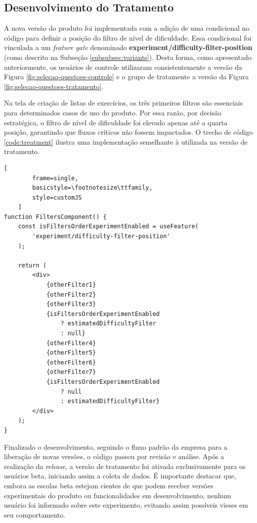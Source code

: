\subsection{Desenvolvimento do Tratamento}

A nova versão do produto foi implementada com a adição de uma condicional no código para definir a posição do filtro de nível de dificuldade. Essa condicional foi vinculada a um \textit{feature gate} denominado \textbf{experiment/difficulty-filter-position} (como descrito na Subseção \ref{subsubsec:variants}). Desta forma, como apresentado anteriormente, os usuários de controle utilizaram consistentemente a versão da Figura \ref{fig:selecao-questoes-controle} e o grupo de tratamente a versão da Figura \ref{fig:selecao-questoes-tratamento}.

Na tela de criação de listas de exercícios, os três primeiros filtros são essenciais para determinados casos de uso do produto. Por essa razão, por decisão estratégica, o filtro de nível de dificuldade foi elevado apenas até a quarta posição, garantindo que fluxos críticos não fossem impactados. O trecho de código \ref{code:treatment} ilustra uma implementação semelhante à utilizada na versão de tratamento.

\begin{code}[!ht]
    \caption{Versão de Tratamento}
    \begin{lstlisting}[
        frame=single,
        basicstyle=\footnotesize\ttfamily,
        style=customJS
    ]
function FiltersComponent() {
    const isFiltersOrderExperimentEnabled = useFeature(
        'experiment/difficulty-filter-position'
    );

    return (
        <div>
            {otherFilter1}
            {otherFilter2}
            {otherFilter3}
            {isFiltersOrderExperimentEnabled 
                ? estimatedDifficultyFilter 
                : null}
            {otherFilter4}
            {otherFilter5}
            {otherFilter6}
            {otherFilter7}
            {isFiltersOrderExperimentEnabled 
                ? null 
                : estimatedDifficultyFilter}
        </div>
    );
}
    \end{lstlisting}
    \label{code:treatment}
\end{code}


Finalizado o desenvolvimento, seguindo o fluxo padrão da empresa para a liberação de novas versões, o código passou por revisão e análise. Após a realização da \textit{release}, a versão de tratamento foi ativada exclusivamente para os usuários beta, iniciando assim a coleta de dados.  É importante destacar que, embora as escolas beta estejam cientes de que podem receber versões experimentais do produto ou funcionalidades em desenvolvimento, nenhum usuário foi informado sobre este experimento, evitando assim possíveis vieses em seu comportamento.




